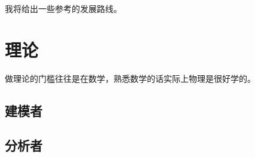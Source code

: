 \documentclass[a4paper,10pt,english]{sphinxmanual}
\begin{document}
我将给出一些参考的发展路线。



\section{理论}
\label{\detokenize{4. ChooseYourSkill:id2}}
做理论的门槛往往是在数学，熟悉数学的话实际上物理是很好学的。


\subsection{建模者}
\label{\detokenize{4. ChooseYourSkill:id3}}

\subsection{分析者}
\end{document}
